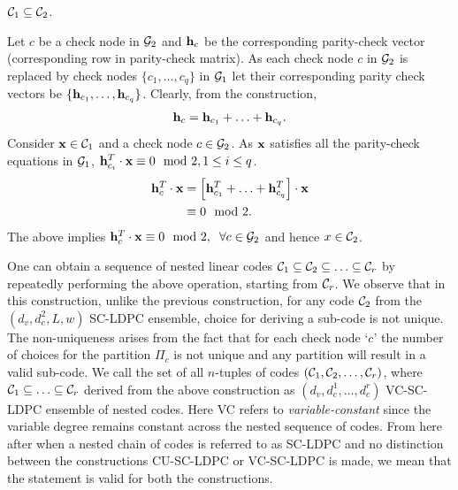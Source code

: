 \documentclass[journal,twocolumn]{IEEEtran}
\begin{document}
\begin{lemma}\label{Lemma:NestedCodes}
$ \mathcal{C}_{1} \subseteq \mathcal{C}_{2}$.
\end{lemma}
\begin{IEEEproof}
Let $c$ be a check node in $\mathcal{G}_{2}$ and $\mathbf{h}_{c}$ be the  corresponding parity-check vector (corresponding row in parity-check matrix). As each check node $c$ in $\mathcal{G}_{2}$ is replaced by check nodes $\{c_{1},\ldots , c_{q}\}$ in $\mathcal{G}_{1}$ let their corresponding parity check vectors be $\{\mathbf{h}_{c_{1}},\ldots , \mathbf{h}_{c_{q}}\}$. Clearly, from the construction,
\begin{align*}
\mathbf{h}_{c}=\mathbf{h}_{c_{1}}+\ldots +\mathbf{h}_{c_{q}}.
\end{align*}
Consider $\mathbf{x}\in\mathcal{C}_{1}$ and a check node $c\in \mathcal{G}_{2}$. As $\mathbf{x}$ satisfies all the parity-check equations in $\mathcal{G}_{1}$, $\mathbf{h}^{T}_{c_{i}}\cdot \mathbf{x}\equiv 0 \mod 2, 1\leq i \leq q$.
\begin{align*}
\mathbf{h}^{T}_{c}\cdot \mathbf{x}&=\left[\mathbf{h}^{T}_{c_{1}}+\ldots +\mathbf{h}^{T}_{c_{q}}\right] \cdot \mathbf{x}\\
												&\equiv 0 \mod 2. 
\end{align*}
The above implies $\mathbf{h}^{T}_{c}\cdot \mathbf{x}\equiv 0 \mod 2, \hspace{0.2cm} \forall c\in \mathcal{G}_{2}$ and hence $x\in \mathcal{C}_{2}$.
\end{IEEEproof}
One can obtain a sequence of nested linear codes $\mathcal{C}_1\subseteq\mathcal{C}_2\subseteq \ldots\subseteq\mathcal{C}_r$ by repeatedly performing the above operation, starting from $\mathcal{C}_{r}$. We observe that in this construction, unlike the previous construction, for any code $\mathcal{C}_{2}$ from the $(d_{v},d_{c}^{2},L,w)$ SC-LDPC ensemble, choice for deriving a sub-code is not unique. The non-uniqueness arises from the fact that for each check node `$c$' the number of choices for the partition $\Pi_{c}$ is not unique and any partition will result in a valid sub-code. We call the set of all $n$-tuples of codes $(\mathcal{C}_{1},\mathcal{C}_{2},\ldots,\mathcal{C}_{r})$, where $\mathcal{C}_{1}\subseteq \ldots\subseteq\mathcal{C}_{r}$ derived from the above construction as $(d_{v},d_{c}^{1},\ldots,d_{c}^{r})$ VC-SC-LDPC ensemble of nested codes. Here VC refers to \textit{variable-constant} since the variable degree remains constant across the nested sequence of codes. From here after when a nested chain of codes is referred to as SC-LDPC and no distinction between the constructions CU-SC-LDPC or VC-SC-LDPC is made, we mean that the statement is valid for both the constructions. 
\end{document}
